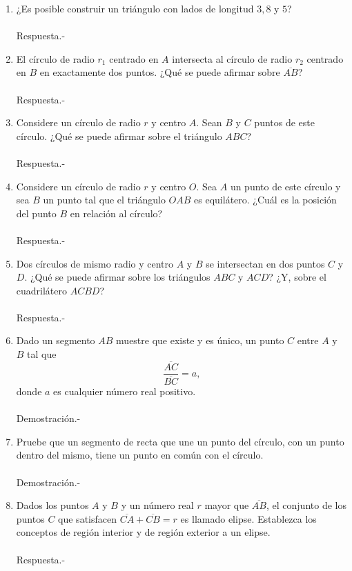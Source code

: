 \documentclass[10pt]{article}
\begin{document}
\begin{enumerate}
	\item ¿Es posible construir un triángulo con lados de longitud $3,8$ y $5$?\\\\
	Respuesta.-\;

	\item El círculo de radio $r_1$ centrado en $A$ intersecta al círculo de radio $r_2$ centrado en $B$ en exactamente dos puntos. ¿Qué se puede afirmar sobre $\overline{AB}$?\\\\
	Respuesta.-\;

	\item Considere un círculo de radio $r$ y centro $A$. Sean $B$ y $C$ puntos de este círculo. ¿Qué se puede afirmar sobre el triángulo $ABC$?\\\\
	Respuesta.-\;

	\item Considere un círculo de radio $r$ y centro $O$. Sea $A$ un punto de este círculo y sea $B$ un punto tal que el triángulo $OAB$ es equilátero. ¿Cuál es la posición del punto $B$ en relación al círculo?\\\\
	Respuesta.-\;

	\item Dos círculos de mismo radio y centro $A$ y $B$ se intersectan en dos puntos $C$ y $D$. ¿Qué se puede afirmar sobre los triángulos $ABC$ y $ACD$? ¿Y, sobre el cuadrilátero $ACBD$?\\\\
	Respuesta.-\;

	\item Dado un segmento $AB$ muestre que existe y es único, un punto $C$ entre $A$ y $B$ tal que $$\dfrac{\overline{AC}}{\overline{BC}}=a,$$ donde $a$ es cualquier número real positivo.\\\\
	Demostración.-\;

	\item Pruebe que un segmento de recta que une un punto del círculo, con un punto dentro del mismo, tiene un punto en común con el círculo.\\\\
	Demostración.-\;

	\item Dados los puntos $A$ y $B$ y un número real $r$ mayor que $\overline{AB}$, el conjunto de los puntos $C$ que satisfacen $\overline{CA}+\overline{CB}=r$ es llamado elipse. Establezca los conceptos de región interior y de región exterior a un elipse.\\\\
	Respuesta.-\;


\end{enumerate}
\end{document}
